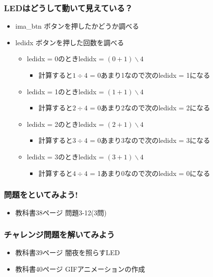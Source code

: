 \begin{frame}
  \frametitle{LEDはどうして動いて見えている？}
  \begin{itemize}
    \item ima\_btn ボタンを押したかどうか調べる
    \item ledidx ボタンを押した回数を調べる
    \begin{itemize}
      \item ledidx = 0のときledidx = $(0+1)\backslash4$
      \begin{itemize}
        \item 計算すると$1\div4$ = 0あまり1なので次のledidx = 1になる
      \end{itemize}
      \item ledidx = 1のときledidx = $(1+1)\backslash4$ 
      \begin{itemize}
        \item 計算すると$2\div4$ = 0あまり2なので次のledidx = 2になる 
      \end{itemize}
      \item ledidx = 2のときledidx = $(2+1)\backslash4$ 
      \begin{itemize}
        \item 計算すると$3\div4$ = 0あまり3なので次のledidx = 3になる
      \end{itemize}
      \item ledidx = 3のときledidx = $(3+1)\backslash4$ 
      \begin{itemize}
        \item 計算すると$4\div4$ = 1あまり0なので次のledidx = 0になる
      \end{itemize}
    \end{itemize}
  \end{itemize}
\end{frame}

\begin{frame}
  \frametitle{問題をといてみよう!}
  \begin{itemize}
    \item 教科書38ページ 問題3-12(3問)
  \end{itemize}
\end{frame}

\begin{frame}
  \frametitle{チャレンジ問題を解いてみよう}
  \begin{itemize}
    \item 教科書39ページ 闇夜を照らすLED
    \item 教科書40ページ GIFアニメーションの作成
  \end{itemize}
\end{frame}